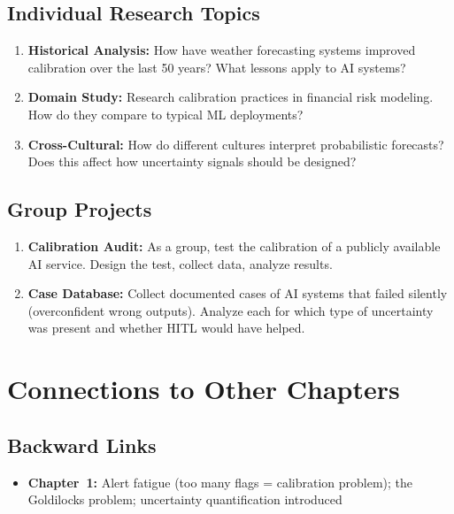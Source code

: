 \subsection{Individual Research Topics}
\begin{enumerate}
    \item \textbf{Historical Analysis:} How have weather forecasting systems improved calibration over the last 50 years? What lessons apply to AI systems?
    \item \textbf{Domain Study:} Research calibration practices in financial risk modeling. How do they compare to typical ML deployments?
    \item \textbf{Cross-Cultural:} How do different cultures interpret probabilistic forecasts? Does this affect how uncertainty signals should be designed?
\end{enumerate}

\subsection{Group Projects}
\begin{enumerate}
    \item \textbf{Calibration Audit:} As a group, test the calibration of a publicly available AI service. Design the test, collect data, analyze results.
    \item \textbf{Case Database:} Collect documented cases of AI systems that failed silently (overconfident wrong outputs). Analyze each for which type of uncertainty was present and whether HITL would have helped.
\end{enumerate}

\section{Connections to Other Chapters}

\subsection{Backward Links}
\begin{itemize}
    \item \textbf{Chapter~1:} Alert fatigue (too many flags = calibration problem); the Goldilocks problem; uncertainty quantification introduced
\end{itemize}

